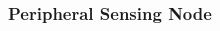 \documentclass{article}
\begin{document}
\subsubsection{Peripheral Sensing Node}


\begin{thebibliography}{fi99}

\end{thebibliography}
\end{document}
